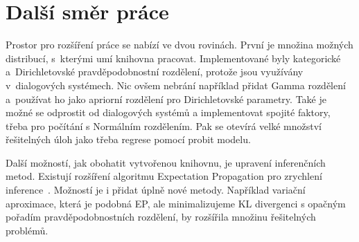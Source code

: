 \section*{Další směr práce}

Prostor pro rozšíření práce se nabízí ve dvou rovinách. 
První je množina možných distribucí, s~kterými umí knihovna pracovat.
Implementované byly kategorické a~Dirichletovské pravděpodobnostní rozdělení, protože jsou využívány v~dialogových systémech.
Nic ovšem nebrání například přidat Gamma rozdělení a~používat ho jako apriorní rozdělení pro Dirichletovské parametry.
Také je možné se odprostit od dialogových systémů a implementovat spojité faktory, třeba pro počítání s Normálním rozdělením.
Pak se otevírá velké množství řešitelných úloh jako třeba regrese pomocí probit modelu.

Další možností, jak obohatit vytvořenou knihovnu, je upravení inferenčních metod.
Existují rozšíření algoritmu Expectation Propagation pro zrychlení inference~\cite{seeger2010fast}.
Možností je i přidat úplně nové metody.
Například variační aproximace, která je podobná EP, ale minimalizujeme KL divergenci s opačným pořadím pravděpodobnostních rozdělení, by rozšířila množinu řešitelných problémů.
